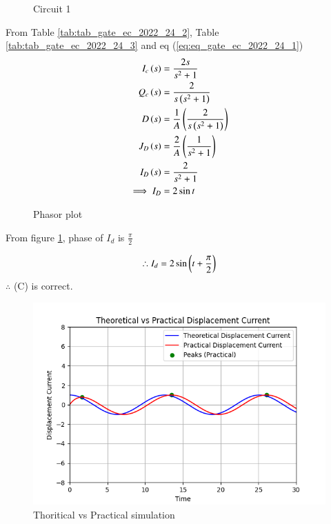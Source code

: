 \documentclass[journal,12pt,twocolumn]{IEEEtran}
\begin{document}
\begin{figure}[ht]
  \centering
      
  \caption{Circuit 1}
\end{figure}

From Table \ref{tab:tab_gate_ec_2022_24_2}, Table \ref{tab:tab_gate_ec_2022_24_3} and eq (\ref{eq:eq_gate_ec_2022_24_1})
\begin{align}
    I_c\left(s\right) &= \frac{2s}{s^2 + 1}\\
    Q_c\left(s\right) &= \frac{2}{s\left(s^2 + 1\right)}\\
    D\left(s\right) &= \frac{1}{A}\left(\frac{2}{s\left(s^2 + 1\right)}\right)\\
    J_D\left(s\right) &= \frac{2}{A}\left(\frac{1}{s^2 + 1}\right)\\
    I_D\left(s\right) &= \frac{2}{s^2 + 1}\\
    \implies I_D &= 2\sin{t}
\end{align}


\begin{figure}[ht]
  \centering
      
  \caption{Phasor plot}
  \label{fig:fig_gate_ec_2022_24_1}
\end{figure}

From figure \ref{fig:fig_gate_ec_2022_24_1}, phase of $I_d$ is $\frac{\pi}{2}$

\begin{align}
    \therefore I_d = 2\sin\left(t + \frac{\pi}{2}\right)
\end{align}
$\therefore$ (C) is correct.


\begin{figure}[ht]
    \centering
    \includegraphics[width=\columnwidth]{2022/EC/24/figs/Figure_2.png}
    \caption{Thoritical vs Practical simulation}
    \label{fig:fig_gate_ec_2022_24_2}
\end{figure}
\end{document}

